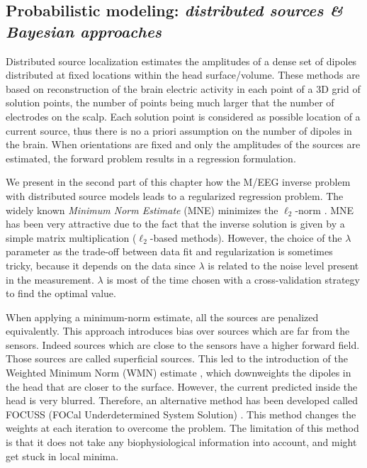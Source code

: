 \subsection{Probabilistic modeling: \textit{distributed sources \& Bayesian approaches}} \label{section_distributed}
Distributed source localization estimates the amplitudes of a dense set of dipoles distributed at fixed locations within the head surface/volume. These methods are based on reconstruction of the brain electric activity in each point of a 3D grid of solution points, the number of points being much larger that the number of electrodes on the scalp. Each solution point is considered as possible location of a current source, thus there is no a priori assumption on the number of dipoles in the brain.
When orientations are fixed and only the amplitudes of the sources are estimated, the forward problem results in a regression formulation.%

We present in the second part of this chapter how the M/EEG inverse problem with distributed source models leads to a regularized regression problem. The widely known \textit{Minimum Norm Estimate} (MNE) minimizes the $\ell_2$-norm \cite{hamalainen1994interpreting}. %
MNE has been very attractive due to the fact that the inverse solution is given by a simple matrix multiplication ($\ell_2$-based methods). However, the choice of the $\lambda$ parameter as the trade-off between data fit and regularization is sometimes tricky, because it depends on the data since $\lambda$ is related to the noise level present in the measurement. $\lambda$ is most of the time chosen with a cross-validation strategy to find the optimal value.

When applying a minimum-norm estimate, all the sources are penalized equivalently. This approach introduces bias over sources which are far from the sensors. Indeed sources which are close to the sensors have a higher forward field. Those sources are called superficial sources. This led to the introduction of the Weighted Minimum Norm (WMN) estimate \cite{lin2006assessing}, which downweights the dipoles in the head that are closer to the surface. However, the current predicted inside the head is very blurred. Therefore, an alternative method has been developed called FOCUSS (FOCal Underdetermined System Solution) \cite{gorodnitsky1995neuromagnetic}. This method changes the weights at each iteration to overcome the problem. The limitation of this method is that it does not take any biophysiological information into account, and might get stuck in local minima.

